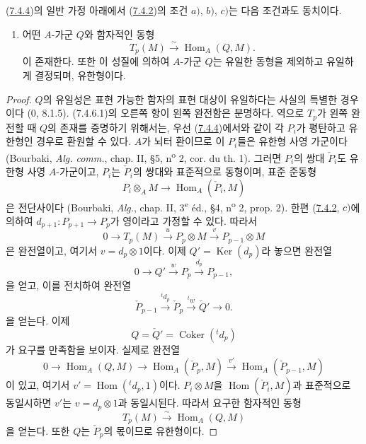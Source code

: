 \begin{proposition}[7.4.6]
\label{III.7.4.6-fr}
(\hyperref[III.7.4.4-fr]{7.4.4})의 일반 가정 아래에서
(\hyperref[III.7.4.2-fr]{7.4.2})의 조건 $a)$, $b)$, $c)$는 다음
조건과도 동치이다.
\begin{enumerate}
  \item[d)] 어떤 $A$-가군 $Q$와 함자적인 동형
    \[
      T_p(M)\xrightarrow{\sim}\operatorname{Hom}_A(Q,M).
      \tag{7.4.6.1}\label{III.7.4.6.1.fr}
    \]
    이 존재한다. 또한 이 성질에 의하여 $A$-가군 $Q$는 유일한
    동형을 제외하고 유일하게 결정되며, 유한형이다.
\end{enumerate}
\end{proposition}

\begin{proof}
$Q$의 유일성은 표현 가능한 함자의 표현 대상이 유일하다는 사실의
특별한 경우이다 (0, 8.1.5). (7.4.6.1)의 오른쪽 항이 왼쪽 완전함은
분명하다. 역으로 $T_p$가 왼쪽 완전할 때 $Q$의 존재를 증명하기
위해서는, 우선 (\hyperref[III.7.4.4-fr]{7.4.4})에서와 같이 각
$P_i$가 평탄하고 유한형인 경우로 환원할 수 있다. $A$가 뇌터
환이므로 이 $P_i$들은 유한형 사영 가군이다 (Bourbaki,
\emph{Alg. comm.}, chap. II, \S 5, n\textsuperscript{o} 2,
cor. du th. 1). 그러면 $P_i$의 쌍대 $\check P_i$도 유한형 사영
$A$-가군이고, $P_i$는 $\check P_i$의 쌍대와 표준적으로 동형이며,
표준 준동형
\[
  P_i\otimes_A M\longrightarrow\operatorname{Hom}_A(\check P_i,M)
\]
은 전단사이다 (Bourbaki, \emph{Alg.}, chap. II,
3\textsuperscript{e} éd., \S 4, n\textsuperscript{o} 2, prop. 2).
한편 (\hyperref[III.7.4.2-fr]{7.4.2}, $c)$에 의하여
$d_{p+1}:P_{p+1}\to P_p$가 영이라고 가정할 수 있다. 따라서
\[
  0\longrightarrow T_p(M)\xrightarrow{u}P_p\otimes M
  \xrightarrow{v}P_{p-1}\otimes M
\]
은 완전열이고, 여기서 $v=d_p\otimes1$이다. 이제
$Q'=\operatorname{Ker}(d_p)$라 놓으면 완전열
\[
  0\longrightarrow Q'\xrightarrow{w}P_p\xrightarrow{d_p}P_{p-1},
\]
을 얻고, 이를 전치하여 완전열
\[
  \check P_{p-1}\xrightarrow{{}^t d_p}\check P_p
  \xrightarrow{{}^t w}\check Q'\longrightarrow0.
\]
을 얻는다. 이제
\[
  Q=\check Q'=\operatorname{Coker}({}^t d_p)
\]
가 요구를 만족함을 보이자. 실제로 완전열
\[
  0\longrightarrow\operatorname{Hom}_A(Q,M)
  \longrightarrow\operatorname{Hom}_A(\check P_p,M)
  \xrightarrow{v'}\operatorname{Hom}_A(\check P_{p-1},M)
\]
이 있고, 여기서 $v'=\operatorname{Hom}({}^t d_p,1)$이다.
$P_i\otimes M$을 $\operatorname{Hom}(\check P_i,M)$과 표준적으로
동일시하면 $v'$는 $v=d_p\otimes1$과 동일시된다. 따라서 요구한
함자적인 동형
\[
  T_p(M)\xrightarrow{\sim}\operatorname{Hom}_A(Q,M)
\]
을 얻는다. 또한 $Q$는 $\check P_p$의 몫이므로 유한형이다.
\end{proof}

